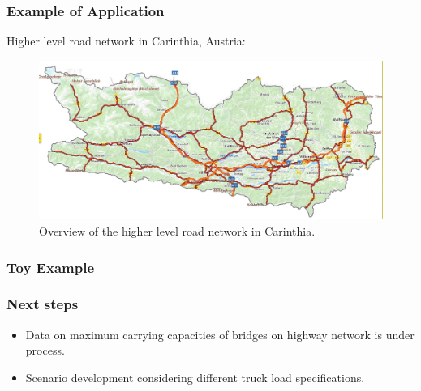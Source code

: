 \documentclass{beamer}   %
\theoremstyle{break}
\begin{document}
  \begin{frame}
    \frametitle{Example of Application}
    
Higher level road network in Carinthia, Austria:
\begin{figure}[!ht]
      \centering
      \includegraphics[width=1.0\textwidth]{../manuscript/figures/map.jpg}
      \caption{Overview of the higher level road network in Carinthia.}
      \label{fig:higher level}
    \end{figure}
  \end{frame}





 \begin{frame}
\frametitle{Toy Example}
    \begin{figure}[!ht]
      \centering
      \scalebox{0.5}{
      
      }
    \end{figure}
  \end{frame}

 \begin{frame}
\frametitle{Next steps}
\begin{itemize}
	\item Data on maximum carrying capacities of bridges on highway network is under process. 
	\item Scenario development considering different truck load specifications. 
 \end{itemize}

  \end{frame}
\end{document}
